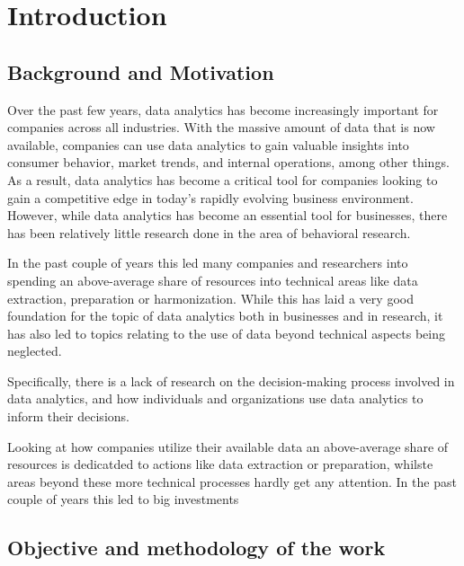 \newpage\section{Introduction}

\subsection{Background and Motivation}

Over the past few years, data analytics has become increasingly important for companies across all industries. With the massive amount of data that is now available, companies can use data analytics to gain valuable insights into consumer behavior, market trends, and internal operations, among other things. As a result, data analytics has become a critical tool for companies looking to gain a competitive edge in today's rapidly evolving business environment. However, while data analytics has become an essential tool for businesses, there has been relatively little research done in the area of behavioral research. 

In the past couple of years this led many companies and researchers into spending an above-average share of resources into technical areas like data extraction, preparation or harmonization. While this has laid a very good foundation for the topic of data analytics both in businesses and in research, it has also led to topics relating to the use of data beyond technical aspects being neglected. 

Specifically, there is a lack of research on the decision-making process involved in data analytics, and how individuals and organizations use data analytics to inform their decisions.




Looking at how companies utilize their available data an above-average share of resources is dedicatded to actions like data extraction or preparation, whilste areas beyond these more technical processes hardly get any attention. In the past couple of years this led to big investments 



\subsection{Objective and methodology of the work}


